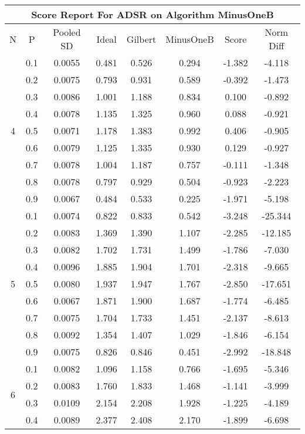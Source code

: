 \documentclass[11pt,a4paper]{report}
\begin{document}
\begin{longtable}{ | c | c || c | c | c | c | c | c | }
\hline
\multicolumn{8}{|c|}{ Score Report For ADSR on Algorithm MinusOneB} \\
\hline
N & P & Pooled SD &  Ideal &  Gilbert & MinusOneB  & Score & Norm Diff \\
 \hline
 \hline
 \endhead
\multirow{9}{*}{4} & 0.1 & 0.0055 & 0.481 & 0.526 & 0.294 & -1.382 & -4.118 \\
 & 0.2 & 0.0075 & 0.793 & 0.931 & 0.589 & -0.392 & -1.473 \\
 & 0.3 & 0.0086 & 1.001 & 1.188 & 0.834 & 0.100 & -0.892 \\
 & 0.4 & 0.0078 & 1.135 & 1.325 & 0.960 & 0.088 & -0.921 \\
 & 0.5 & 0.0071 & 1.178 & 1.383 & 0.992 & 0.406 & -0.905 \\
 & 0.6 & 0.0079 & 1.125 & 1.335 & 0.930 & 0.129 & -0.927 \\
 & 0.7 & 0.0078 & 1.004 & 1.187 & 0.757 & -0.111 & -1.348 \\
 & 0.8 & 0.0078 & 0.797 & 0.929 & 0.504 & -0.923 & -2.223 \\
 & 0.9 & 0.0067 & 0.484 & 0.533 & 0.225 & -1.971 & -5.198 \\
 \hline
\multirow{9}{*}{5} & 0.1 & 0.0074 & 0.822 & 0.833 & 0.542 & -3.248 & -25.344 \\
 & 0.2 & 0.0083 & 1.369 & 1.390 & 1.107 & -2.285 & -12.185 \\
 & 0.3 & 0.0082 & 1.702 & 1.731 & 1.499 & -1.786 & -7.030 \\
 & 0.4 & 0.0096 & 1.885 & 1.904 & 1.701 & -2.318 & -9.665 \\
 & 0.5 & 0.0080 & 1.937 & 1.947 & 1.767 & -2.850 & -17.651 \\
 & 0.6 & 0.0067 & 1.871 & 1.900 & 1.687 & -1.774 & -6.485 \\
 & 0.7 & 0.0075 & 1.704 & 1.733 & 1.451 & -2.137 & -8.613 \\
 & 0.8 & 0.0092 & 1.354 & 1.407 & 1.029 & -1.846 & -6.154 \\
 & 0.9 & 0.0075 & 0.826 & 0.846 & 0.451 & -2.992 & -18.848 \\
 \hline
\multirow{9}{*}{6} & 0.1 & 0.0082 & 1.096 & 1.158 & 0.766 & -1.695 & -5.346 \\
 & 0.2 & 0.0083 & 1.760 & 1.833 & 1.468 & -1.141 & -3.999 \\
 & 0.3 & 0.0109 & 2.154 & 2.208 & 1.928 & -1.225 & -4.189 \\
 & 0.4 & 0.0089 & 2.377 & 2.408 & 2.170 & -1.899 & -6.698 \\

\end{longtable}
\end{document}
